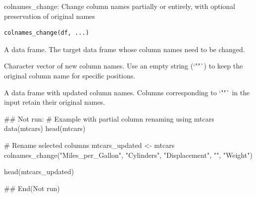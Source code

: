 \documentclass[a4paper]{book}
\begin{document}
%
\begin{Description}
colnames\_change: Change column names partially or entirely, with optional preservation of original names
\end{Description}
%
\begin{Usage}
\begin{verbatim}
colnames_change(df, ...)
\end{verbatim}
\end{Usage}
%
\begin{Arguments}
\begin{ldescription}
\item[\code{df}] A data frame. The target data frame whose column names need to be changed.

\item[\code{...}] Character vector of new column names. Use an empty string (`""`) to keep the original column name for specific positions.
\end{ldescription}
\end{Arguments}
%
\begin{Value}
A data frame with updated column names. Columns corresponding to `""` in the input retain their original names.
\end{Value}
%
\begin{Examples}
\begin{ExampleCode}
\#\# Not run: 
# Example with partial column renaming using mtcars
data(mtcars)
head(mtcars)

# Rename selected columns
mtcars_updated <- mtcars %
  colnames_change("Miles_per_Gallon", "Cylinders", "Displacement", "", "Weight")

head(mtcars_updated)

## End(Not run)

\end{ExampleCode}
\end{Examples}
\end{document}
